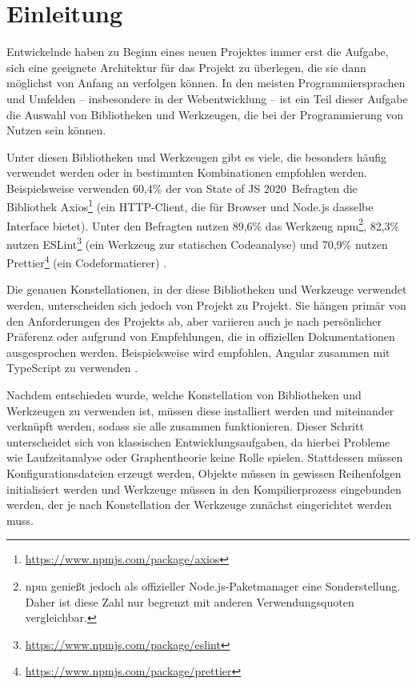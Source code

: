 \section{Einleitung}
Entwickelnde haben zu Beginn eines neuen Projektes immer erst die Aufgabe, sich eine geeignete Architektur für das Projekt zu überlegen, die sie dann möglichst von Anfang an verfolgen können. In den meisten Programmiersprachen und Umfelden -- insbesondere in der Webentwicklung -- ist ein Teil dieser Aufgabe die Auswahl von Bibliotheken und Werkzeugen, die bei der Programmierung von Nutzen sein können.

Unter diesen Bibliotheken und Werkzeugen gibt es viele, die besonders häufig verwendet werden oder in bestimmten Kombinationen empfohlen werden. Beispielsweise verwenden 60,4\% der von \glqq State of JS 2020\grqq\ Befragten die Bibliothek Axios\footnote{\url{https://www.npmjs.com/package/axios}} (ein HTTP-Client, die für Browser und Node.js dasselbe Interface bietet). Unter den Befragten nutzen 89,6\% das Werkzeug \gls{npm}\footnote{\gls{npm} genießt jedoch als offizieller Node.js-Paketmanager eine Sonderstellung. Daher ist diese Zahl nur begrenzt mit anderen Verwendungsquoten vergleichbar.}, 82,3\% nutzen ESLint\footnote{\url{https://www.npmjs.com/package/eslint}} (ein Werkzeug zur statischen Codeanalyse) und 70,9\% nutzen Prettier\footnote{\url{https://www.npmjs.com/package/prettier}} (ein Codeformatierer) \cite{stateofjs}.

Die genauen Konstellationen, in der diese Bibliotheken und Werkzeuge verwendet werden, unterscheiden sich jedoch von Projekt zu Projekt. Sie hängen primär von den Anforderungen des Projekts ab, aber variieren auch je nach persönlicher Präferenz oder aufgrund von Empfehlungen, die in offiziellen Dokumentationen ausgesprochen werden. Beispielsweise wird empfohlen, Angular zusammen mit TypeScript zu verwenden \cite{angular_only_with_typescript}.

Nachdem entschieden wurde, welche Konstellation von Bibliotheken und Werkzeugen zu verwenden ist, müssen diese installiert werden und miteinander verknüpft werden, sodass sie alle zusammen funktionieren. Dieser Schritt unterscheidet sich von klassischen Entwicklungsaufgaben, da hierbei Probleme wie Laufzeitanalyse oder Graphentheorie keine Rolle spielen. Stattdessen müssen Konfigurationsdateien erzeugt werden, Objekte müssen in gewissen Reihenfolgen initialisiert werden und Werkzeuge müssen in den Kompilierprozess eingebunden werden, der je nach Konstellation der Werkzeuge zunächst eingerichtet werden muss.

